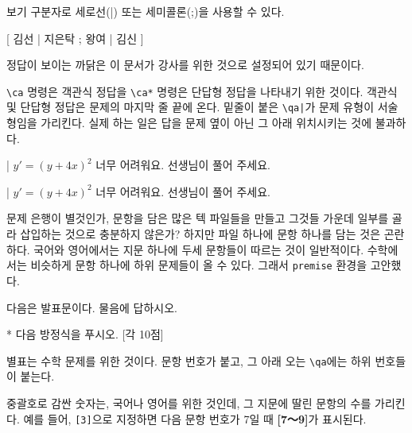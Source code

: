 \documentclass[a4paper]{oblivoir}
\begin{document}
보기 구분자로 세로선(|) 또는 세미콜론(;)을 사용할 수 있다.

\begin{example}
[ 
김선 | 
지은탁 ; 
왕여 | 
김신 
]{
}
\end{example}

정답이 보이는 까닭은 이 문서가 강사를 위한 것으로 설정되어 있기 때문이다.

\begin{boxedverbatim}
\end{boxedverbatim}

\verb|\ca| 명령은 객관식 정답을 \verb|\ca*| 명령은 단답형 정답을 나타내기 위한 것이다.
객관식 및 단답형 정답은 문제의 마지막 줄 끝에 온다.
밑줄이 붙은 \verb_\qa|_가 문제 유형이 서술형임을 가리킨다. 실제 하는 일은 답을 문제 옆이 아닌 그 아래 위치시키는 것에 불과하다.

\begin{boxedverbatim}
\qa|{
$y' = (y + 4x)^2$
}{
너무 어려워요.
선생님이 풀어 주세요.
}
\end{boxedverbatim}

\begin{example}
\qa|{
$y' = (y + 4x)^2$
}{
너무 어려워요.
선생님이 풀어 주세요.
}
\end{example}

문제 은행이 별것인가, 문항을 담은 많은 텍 파일들을 만들고 그것들 가운데 일부를 골라 삽입하는 것으로 충분하지 않은가?
하지만 파일 하나에 문항 하나를 담는 것은 곤란하다.
국어와 영어에서는 지문 하나에 두세 문항들이 따르는 것이 일반적이다.
수학에서는 비슷하게 문항 하나에 하위 문제들이 올 수 있다. 
그래서 \texttt{premise} 환경을 고안했다.

\begin{boxedverbatim}
\begin{premise}[2]
다음은 발표문이다. 물음에 답하시오.
\end{premise}

\begin{premise}*
다음 방정식을 푸시오. [각 10점]
\end{premise}
\end{boxedverbatim}

별표는 수학 문제를 위한 것이다. 문항 번호가 붙고, 그 아래 오는 \verb|\qa|에는 하위 번호들이 붙는다.

중괄호로 감싼 숫자는, 국어나 영어를 위한 것인데, 그 지문에 딸린 문항의 수를 가리킨다.
예를 들어, \texttt{[3]}으로 지정하면 다음 문항 번호가 7일 때 \textbf{[7〜9]}가 표시된다.
\end{document}
